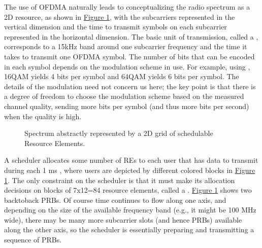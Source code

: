 \documentclass[a4paper,11pt,english]{sphinxmanual}
\let\sphinxpxdimen\pdfpxdimen\else\newdimen\sphinxpxdimen
\begin{document}
\sphinxAtStartPar
The use of OFDMA naturally leads to conceptualizing the radio spectrum
as a 2\sphinxhyphen{}D resource, as shown in \hyperref[\detokenize{radio:fig-sched-grid}]{Figure \ref{\detokenize{radio:fig-sched-grid}}},
with the subcarriers represented in the vertical dimension and the time to
transmit symbols on each subcarrier represented in the horizontal dimension.
The basic unit of transmission, called a ,
corresponds to a 15\sphinxhyphen{}kHz band around one subcarrier frequency and the
time it takes to transmit one OFDMA symbol. The number of bits that
can be encoded in each symbol depends on the modulation scheme in use.
For example, using , 16\sphinxhyphen{}QAM
yields 4 bits per symbol and 64\sphinxhyphen{}QAM yields 6 bits per symbol. The
details of the modulation need not concern us here; the key point is
that there is a degree of freedom to choose the modulation scheme
based on the measured channel quality, sending more bits per symbol
(and thus more bits per second) when the quality is high.

\begin{figure}[ht]
\centering
\capstart

\noindent\sphinxincludegraphics[width=600\sphinxpxdimen]{{Slide17}.png}
\caption{Spectrum abstractly represented by a 2\sphinxhyphen{}D grid of
schedulable Resource Elements.}\label{\detokenize{radio:id8}}\label{\detokenize{radio:fig-sched-grid}}\end{figure}

\sphinxAtStartPar
A scheduler allocates some number of REs to each user that has data to
transmit during each 1 ms , where users
are depicted by different colored blocks in \hyperref[\detokenize{radio:fig-sched-grid}]{Figure \ref{\detokenize{radio:fig-sched-grid}}}.
The only constraint on the scheduler is that it must make its allocation
decisions on blocks of 7x12=84 resource elements, called a . \hyperref[\detokenize{radio:fig-sched-grid}]{Figure \ref{\detokenize{radio:fig-sched-grid}}} shows two
back\sphinxhyphen{}to\sphinxhyphen{}back PRBs. Of course time continues to flow along one axis, and
depending on the size of the available frequency band (e.g., it might be
100 MHz wide), there may be many more subcarrier slots (and hence PRBs)
available along the other axis, so the scheduler is essentially
preparing and transmitting a sequence of PRBs.
\end{document}
